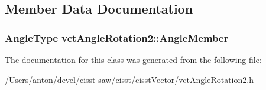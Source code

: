 \subsection{Member Data Documentation}
\hypertarget{classvct_angle_rotation2_a400d22472af231f8a133eea69446ea7a}{}
\subsubsection[{Angle\+Member}]{\setlength{\rightskip}{0pt plus 5cm}Angle\+Type vct\+Angle\+Rotation2\+::\+Angle\+Member\hspace{0.3cm}{\ttfamily [protected]}}\label{classvct_angle_rotation2_a400d22472af231f8a133eea69446ea7a}


The documentation for this class was generated from the following file\+:\begin{DoxyCompactItemize}
\item 
/\+Users/anton/devel/cisst-\/saw/cisst/cisst\+Vector/\hyperlink{vct_angle_rotation2_8h}{vct\+Angle\+Rotation2.\+h}\end{DoxyCompactItemize}
